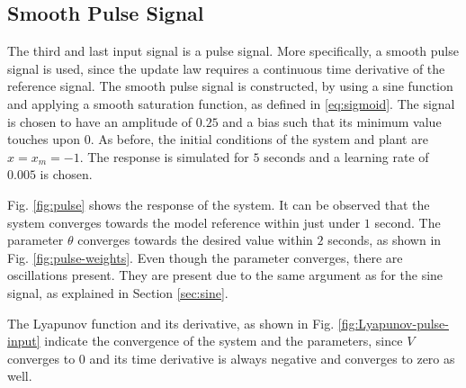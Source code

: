 \subsection{Smooth Pulse Signal}
The third and last input signal is a pulse signal. More specifically, a smooth pulse signal is used, since the update law requires a continuous time derivative of the reference signal. The smooth pulse signal is constructed, by using a sine function and applying a smooth saturation function, as defined in \eqref{eq:sigmoid}. The signal is chosen to have an amplitude of $0.25$ and a bias such that its minimum value touches upon $0$. As before, the initial conditions of the system and plant are $x=x_m=-1$. The response is simulated for $5$ seconds and a learning rate of $0.005$ is chosen.

Fig. \ref{fig:pulse} shows the response of the system. It can be observed that the system converges towards the model reference within just under $1$ second. The parameter $\theta$ converges towards the desired value within $2$ seconds, as shown in Fig. \ref{fig:pulse-weights}. Even though the parameter converges, there are oscillations present. They are present due to the same argument as for the sine signal, as explained in Section \ref{sec:sine}.

The Lyapunov function and its derivative, as shown in Fig. \ref{fig:Lyapunov-pulse-input} indicate the convergence of the system and the parameters, since $V$ converges to $0$ and its time derivative is always negative and converges to zero as well.

